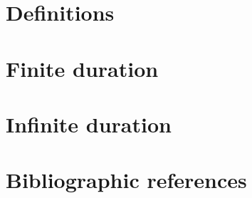 \section{Definitions}
\label{8-sec:definitions}


\section{Finite duration}
\label{8-sec:finite_duration}


\section{Infinite duration}
\label{8-sec:infinite_duration}


\section*{Bibliographic references}
\label{8-sec:references}


